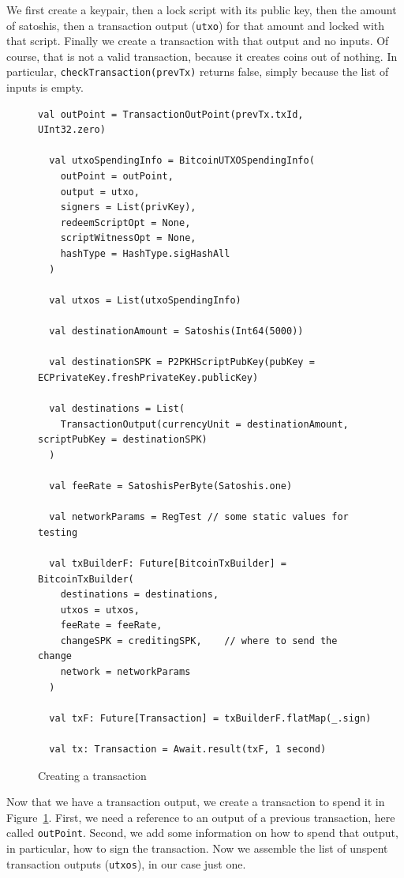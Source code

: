 \documentclass[hyphens, a4paper,USenglish,cleveref, autoref, thm-restate]{oasics-v2019}
\begin{document}
We first create a keypair, then a lock script with its public key,
then the amount of satoshis, then a transaction output (\texttt{utxo})
for that amount and locked with that script. Finally we create a
transaction with that output and no inputs. Of course, that is not a
valid transaction, because it creates coins out of nothing. In
particular, \texttt{checkTransaction(prevTx)} returns false, simply
because the list of inputs is empty.

\begin{figure}
\begin{lstlisting}[style=scala]
  val outPoint = TransactionOutPoint(prevTx.txId, UInt32.zero)

  val utxoSpendingInfo = BitcoinUTXOSpendingInfo(
    outPoint = outPoint,
    output = utxo,
    signers = List(privKey),
    redeemScriptOpt = None,
    scriptWitnessOpt = None,
    hashType = HashType.sigHashAll
  )

  val utxos = List(utxoSpendingInfo)

  val destinationAmount = Satoshis(Int64(5000))

  val destinationSPK = P2PKHScriptPubKey(pubKey = ECPrivateKey.freshPrivateKey.publicKey)

  val destinations = List(
    TransactionOutput(currencyUnit = destinationAmount, scriptPubKey = destinationSPK)
  )

  val feeRate = SatoshisPerByte(Satoshis.one)

  val networkParams = RegTest // some static values for testing

  val txBuilderF: Future[BitcoinTxBuilder] = BitcoinTxBuilder(
    destinations = destinations, 
    utxos = utxos,               
    feeRate = feeRate,           
    changeSPK = creditingSPK,    // where to send the change
    network = networkParams      
  )

  val txF: Future[Transaction] = txBuilderF.flatMap(_.sign)

  val tx: Transaction = Await.result(txF, 1 second)
\end{lstlisting}
  \caption{Creating a transaction}
  \label{fig:tx}
\end{figure}

Now that we have a transaction output, we create a transaction to
spend it in Figure~\ref{fig:tx}. First, we need a reference to an
output of a previous transaction, here called
\texttt{outPoint}. Second, we add some information on how to spend
that output, in particular, how to sign the transaction. Now we
assemble the list of unspent transaction outputs (\texttt{utxos}), in our case
just one.
\end{document}
